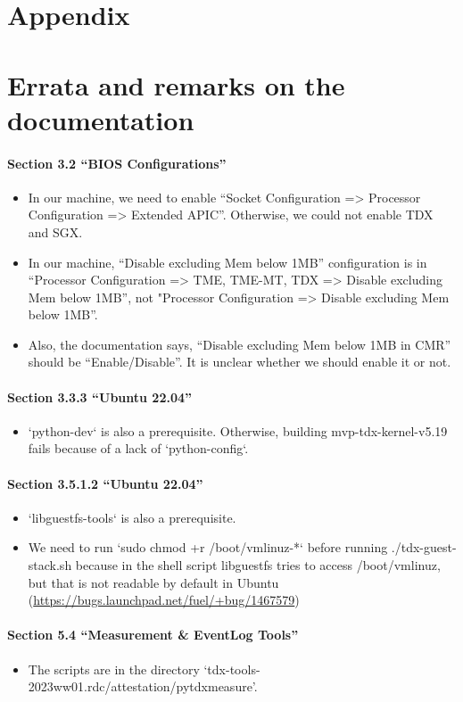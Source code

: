\documentclass[letterpaper,twocolumn,10pt]{article}
\newcommand{\myparagraph}{\paragraph}
\begin{document}
\appendix
\section*{Appendix}
\section{Errata and remarks on the documentation~\cite{linux-stacks-for-intel-tdx-2023ww01}}
\myparagraph{Section 3.2 ``BIOS Configurations''}
\begin{itemize}
    \item In our machine, we need to enable ``Socket Configuration => Processor Configuration => Extended APIC''. Otherwise, we could not enable TDX and SGX.
    \item In our machine, ``Disable excluding Mem below 1MB'' configuration is in ``Processor Configuration => TME, TME-MT, TDX => Disable excluding Mem below 1MB'', not "Processor Configuration => Disable excluding Mem below 1MB''.
    \item Also, the documentation says, ``Disable excluding Mem below 1MB in CMR'' should be ``Enable/Disable''. It is unclear whether we should enable it or not.
\end{itemize}

\myparagraph{Section 3.3.3 ``Ubuntu 22.04''}
\begin{itemize}
    \item `python-dev` is also a prerequisite. Otherwise, building mvp-tdx-kernel-v5.19 fails because of a lack of `python-config`.
\end{itemize}

\myparagraph{Section 3.5.1.2 ``Ubuntu 22.04''}
\begin{itemize}
    \item `libguestfs-tools` is also a prerequisite.
    \item We need to run `sudo chmod +r /boot/vmlinuz-*` before  running ./tdx-guest-stack.sh because in the shell script libguestfs tries to access /boot/vmlinuz, but that is not readable by default in Ubuntu (\url{https://bugs.launchpad.net/fuel/+bug/1467579})
\end{itemize}

\myparagraph{Section 5.4 ``Measurement \& EventLog Tools''}
\begin{itemize}
    \item The scripts are in the directory `tdx-tools-2023ww01.rdc/attestation/pytdxmeasure'.
\end{itemize}
\end{document}
